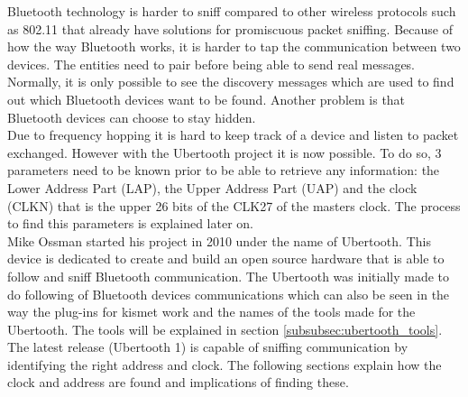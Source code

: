 \label{subsubsec:ubertooth}
Bluetooth technology is harder to sniff compared to other wireless protocols such as 802.11 that already have solutions for promiscuous packet sniffing. Because of how the way Bluetooth works, it is harder to tap the communication between two devices. The entities need to pair before being able to send real messages. Normally, it is only possible to see the discovery messages which are used to find out which Bluetooth devices want to be found. Another problem is that Bluetooth devices can choose to stay hidden. \\
Due to frequency hopping it is hard to keep track of a device and listen to packet exchanged. However with the Ubertooth project it is now possible. To do so, 3 parameters need to be known prior to be able to retrieve any information: the Lower Address Part (LAP), the Upper Address Part (UAP) and the clock (CLKN) that is the upper 26 bits of the CLK27 of the masters clock. The process to find this parameters is explained later on.
\\
Mike Ossman started his project in 2010 under the name of Ubertooth. This device is dedicated to create and build an open source hardware that is able to follow and sniff Bluetooth communication. The Ubertooth was initially made to do following of Bluetooth devices communications which can also be seen in the way the plug-ins for kismet work and the names of the tools made for the Ubertooth. The tools will be explained in section \ref{subsubsec:ubertooth_tools}. The latest release (Ubertooth 1) is capable of sniffing communication by identifying the right address and clock. The following sections explain how the clock and address are found and implications of finding these.

